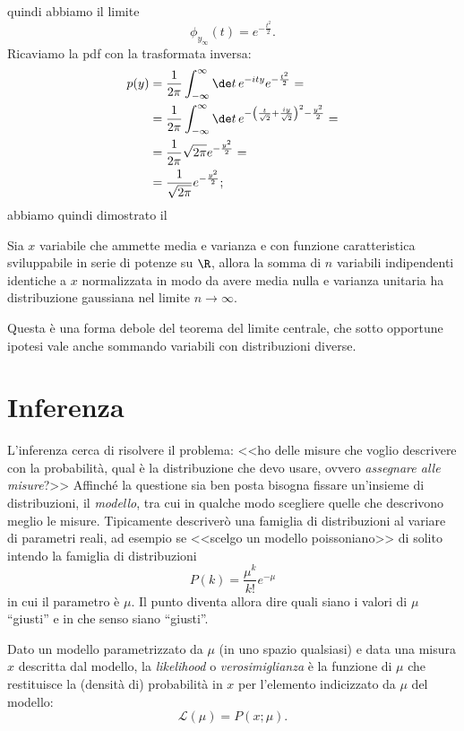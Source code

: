 quindi abbiamo il limite
\begin{equation*}
	\phi_{y_\infty}(t) = e^{-\frac{t^2}2}.
\end{equation*}
Ricaviamo la pdf con la trasformata inversa:
\begin{align*}
	p(y)
	&= \frac1{2\pi} \int_{-\infty}^\infty \de t\, e^{-ity} e^{-\frac{t^2}2} = \\
	&= \frac1{2\pi} \int_{-\infty}^\infty \de t\,
	e^{-\left(\frac t{\sqrt 2} + \frac{iy}{\sqrt 2}\right)^2 - \frac{y^2}2} = \\
	&= \frac1{2\pi} \sqrt{2\pi} e^{-\frac{y^2}2} = \\
	&= \frac1{\sqrt{2\pi}} e^{-\frac{y^2}2};
\end{align*}
abbiamo quindi dimostrato il
\begin{theorem}
	Sia $x$ variabile che ammette media e varianza e con funzione caratteristica sviluppabile in serie di potenze su $\R$,
	allora la somma di $n$ variabili indipendenti identiche a $x$ normalizzata in modo da avere media nulla e varianza unitaria ha distribuzione gaussiana nel limite $n\to\infty$.
\end{theorem}
Questa è una forma debole del teorema del limite centrale, che sotto opportune ipotesi vale anche sommando variabili con distribuzioni diverse.

\chapter{Inferenza}

L'inferenza cerca di risolvere il problema:
<<ho delle misure che voglio descrivere con la probabilità,
qual è la distribuzione che devo usare, ovvero \emph{assegnare alle misure}?>>
Affinché la questione sia ben posta bisogna fissare un'insieme di distribuzioni, il \emph{modello},
tra cui in qualche modo scegliere quelle che descrivono meglio le misure.
Tipicamente descriverò una famiglia di distribuzioni al variare di parametri reali,
ad esempio se <<scelgo un modello poissoniano>> di solito intendo la famiglia di distribuzioni
\begin{equation*}
	P(k) = \frac{\mu^k}{k!}e^{-\mu}
\end{equation*}
in cui il parametro è $\mu$.
Il punto diventa allora dire quali siano i valori di $\mu$ ``giusti'' e in che senso siano ``giusti''.

\begin{definition}[Likelihood]
	Dato un modello parametrizzato da $\mu$ (in uno spazio qualsiasi)
	e data una misura $x$ descritta dal modello,
	la \emph{likelihood} o \emph{verosimiglianza} è la funzione di $\mu$
	che restituisce la (densità di) probabilità in $x$ per l'elemento indicizzato da $\mu$ del modello:
	\begin{equation*}
		\mathcal L(\mu) = P(x;\mu).
	\end{equation*}
\end{definition}

